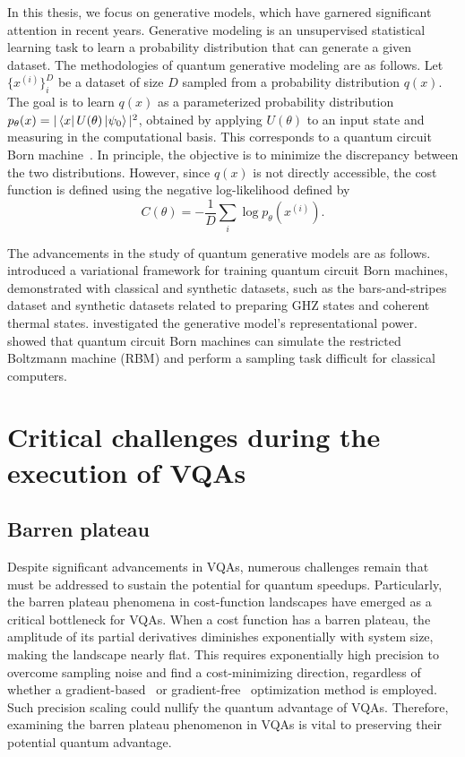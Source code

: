 \documentclass[12pt,dvipdfmx,twoside,openright]{report}
\begin{document}
In this thesis, we focus on generative models, which have garnered significant attention in recent years.
Generative modeling is an unsupervised statistical learning task to learn a probability distribution that can generate a given dataset.
The methodologies of quantum generative modeling are as follows.
Let $\{x^{(i)}\}_i^D$ be a dataset of size $D$ sampled from a probability distribution $q(x)$.
The goal is to learn $q(x)$ as a parameterized probability distribution $p_\theta(x)=|\bra{x}U(\theta)\ket{\psi_0}|^2$, obtained by applying $U(\theta)$ to an input state and measuring in the computational basis.
This corresponds to a quantum circuit Born machine~\cite{born-machine}.
In principle, the objective is to minimize the discrepancy between the two distributions.
However, since $q(x)$ is not directly accessible, the cost function is defined using the negative log-likelihood defined by
\begin{equation}
    C(\theta)=-\frac{1}{D}\sum_i \log{p_\theta (x^{(i)})}.
\end{equation}

The advancements in the study of quantum generative models are as follows.
\cite{born-machine} introduced a variational framework for training quantum circuit Born machines, demonstrated with classical and synthetic datasets, such as the bars-and-stripes dataset and synthetic datasets related to preparing GHZ states and coherent thermal states.
\cite{q-generative2} investigated the generative model's representational power.
\cite{q-generative3} showed that quantum circuit Born machines can simulate the restricted Boltzmann machine (RBM) and perform a sampling task difficult for classical computers.


\section{Critical challenges during the execution of VQAs}



\subsection{Barren plateau}
Despite significant advancements in VQAs, numerous challenges remain that must be addressed to sustain the potential for quantum speedups.
Particularly, the barren plateau phenomena in cost-function landscapes have emerged as a critical bottleneck for VQAs.
When a cost function has a barren plateau, the amplitude of its partial derivatives diminishes exponentially with system size, making the landscape nearly flat.
This requires exponentially high precision to overcome sampling noise and find a cost-minimizing direction, regardless of whether a gradient-based~\cite{gradient-based} or gradient-free~\cite{gradient-free} optimization method is employed.
Such precision scaling could nullify the quantum advantage of VQAs.
Therefore, examining the barren plateau phenomenon in VQAs is vital to preserving their potential quantum advantage.
\end{document}
